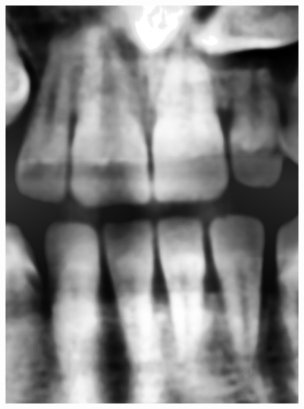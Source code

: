 \documentclass[11pt]{article}
\begin{document}
\begin{figure}[H]
\begin{minipage}{.30\textwidth}
  \centering
  \includegraphics[width=\linewidth]{AHEcropped}
  \captionsetup{justification=centering}
  \label{fig:ahe}
\end{minipage}%
\hspace{1em}
\begin{minipage}{.30\textwidth}
  \centering

\end{minipage}
\end{figure}
\end{document}
